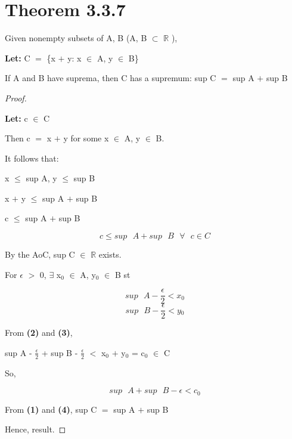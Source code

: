 \documentclass{article}
\newcommand{\mt}[1]{\ensuremath{#1}}
\newcommand\bsc[2][\DefaultOpt]{%
  \def\DefaultOpt{#2}%
  \section[#1]{#2}%
}
\newcommand{\bgpf}{\begin{proof} $ $\newline}
\newcommand{\lt}[1]{\textbf{Let: } #1}
\newcommand{\bpth}[1]{\textbf{(#1)}}
\newcommand{\step}[2]{\begin{equation}\tag{#2}#1\end{equation}}
\newcommand{\epf}{\end{proof}}
\newcommand{\br}{\mt{\mathbb{R}} }       %
\newcommand{\ep}{\mt{\epsilon} }         %
\newcommand{\fa}{\mt{\forall} }          %
\newcommand{\mem}{\mt{\in} }
\newcommand{\exs}{\mt{\exists} }
\newcommand{\sbs}{\mt{\subset} }         %
\newcommand{\eql}{\mt{=} }
\newcommand{\uw}[2]{#1\mt{_{#2}}}
\newcommand{\frc}[2]{\mt{\frac{#1}{#2}}}
\begin{document}
\bsc{Theorem 3.3.7}{

Given nonempty subsets of A, B (A, B \sbs \br),

\lt{C \eql \{x $+$ y: x \mem A, y \mem B\}}

If A and B have suprema, then C has a supremum: sup C \eql sup A $+$ sup B

\bgpf

\lt{c \mem C}

Then c \eql x $+$ y for some x \mem A, y \mem B.

It follows that:

x $\leq$ sup A, y $\leq$ sup B

x $+$ y $\leq$ sup A $+$ sup B

c $\leq$ sup A $+$ sup B

\step{c \leq sup\textrm{ }A + sup\textrm{ }B \textrm{ } \fa\textrm{ }c \mem C}{1}

By the AoC, sup C \mem \br exists.

For \ep $>$ 0, \exs \uw{x}{0} \mem A, \uw{y}{0} \mem B st

\step{sup \textrm{  } A - \frac{\ep}{2} < \uw{x}{0}}{2}
\step{sup \textrm{  } B - \frac{\ep}{2} < \uw{y}{0}}{3}

From \bpth{2} and \bpth{3}, 

sup A - \frc{\ep}{2} + sup B - \frc{\ep}{2} $<$ \uw{x}{0} $+$ \uw{y}{0} = \uw{c}{0} \mem C

So, 

\step{sup\textrm{ }A + sup\textrm{ }B - \ep < \uw{c}{0}}{4}

From \bpth{1} and \bpth{4}, sup C \eql sup A $+$ sup B

Hence, result.

\epf

}

\newpage
\end{document}

